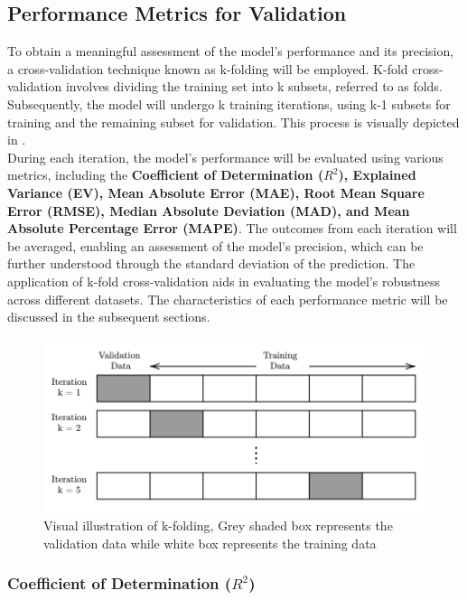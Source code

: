 \subsection{Performance Metrics for Validation}\label{sec:perf_metrics}

To obtain a meaningful assessment of the model's performance and its precision, a cross-validation technique known as k-folding will be employed. K-fold cross-validation involves dividing the training set into k subsets, referred to as folds. Subsequently, the model will undergo k training iterations, using k-1 subsets for training and the remaining subset for validation. This process is visually depicted in .\\

During each iteration, the model's performance will be evaluated using various metrics, including the \textbf{Coefficient of Determination ($R^2$), Explained Variance (EV), Mean Absolute Error (MAE), Root Mean Square Error (RMSE), Median Absolute Deviation (MAD), and Mean Absolute Percentage Error (MAPE)}. The outcomes from each iteration will be averaged, enabling an assessment of the model's precision, which can be further understood through the standard deviation of the prediction. The application of k-fold cross-validation aids in evaluating the model's robustness across different datasets. The characteristics of each performance metric will be discussed in the subsequent sections.\\

\begin{figure}
    \centering
    \includegraphics[width=.85\textwidth]{02_figures/kfold.png}
    \caption{Visual illustration of k-folding, Grey shaded box represents the validation data while white box represents the training data}
    \label{fig:kfold}
\end{figure}

\subsubsection*{Coefficient of Determination ({$R^2$})}\label{sec:rsquared}


